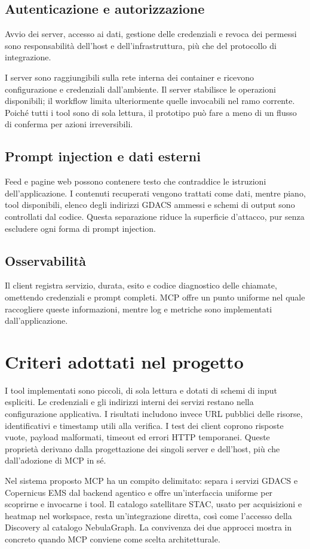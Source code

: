 \subsection{Autenticazione e autorizzazione}

Avvio dei server, accesso ai dati, gestione delle credenziali e revoca dei
permessi sono responsabilità dell'host e dell'infrastruttura, più che del
protocollo di integrazione.

I server sono raggiungibili sulla rete interna dei container e ricevono
configurazione e credenziali dall'ambiente. Il server stabilisce le operazioni
disponibili; il workflow limita ulteriormente quelle invocabili nel ramo
corrente. Poiché tutti i tool sono di sola lettura, il prototipo può fare a meno
di un flusso di conferma per azioni irreversibili.

\subsection{Prompt injection e dati esterni}

Feed e pagine web possono contenere testo che contraddice le istruzioni
dell'applicazione. I contenuti recuperati vengono trattati come dati, mentre
piano, tool disponibili, elenco degli indirizzi GDACS ammessi e schemi di output
sono controllati dal codice. Questa separazione riduce la superficie d'attacco,
pur senza escludere ogni forma di prompt injection.

\subsection{Osservabilità}

Il client registra servizio, durata, esito e codice diagnostico delle chiamate,
omettendo credenziali e prompt completi. MCP offre un punto uniforme nel quale
raccogliere queste informazioni, mentre log e metriche sono implementati
dall'applicazione.

\section{Criteri adottati nel progetto}

I tool implementati sono piccoli, di sola lettura e dotati di schemi di input
espliciti. Le credenziali e gli indirizzi interni dei servizi restano nella
configurazione applicativa. I risultati includono invece URL pubblici delle
risorse, identificativi e timestamp utili alla verifica. I test dei client
coprono risposte vuote, payload malformati, timeout ed errori HTTP temporanei.
Queste proprietà derivano dalla progettazione dei singoli server e dell'host,
più che dall'adozione di MCP in sé.

Nel sistema proposto MCP ha un compito delimitato: separa i servizi GDACS
e Copernicus EMS dal backend agentico e offre un'interfaccia uniforme per
scoprirne e invocarne i tool. Il catalogo satellitare STAC, usato per
acquisizioni e heatmap nel workspace, resta un'integrazione diretta, così come
l'accesso della Discovery al catalogo NebulaGraph. La convivenza dei due
approcci mostra in concreto quando MCP conviene come scelta architetturale.

